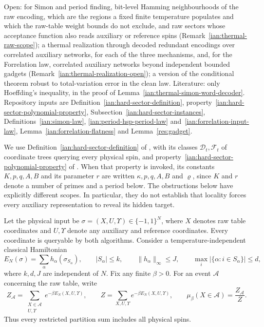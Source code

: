 Open: for Simon and period finding, bit-level Hamming neighbourhoods of the raw encoding, which are the regions a fixed finite temperature populates and which the raw-table weight bounds do not exclude, and raw sectors whose acceptance function also reads auxiliary or reference spins (Remark~\ref{ian:thermal-raw-scope}); a thermal realization through decoded redundant encodings over correlated auxiliary networks, for each of the three mechanisms, and, for the Forrelation law, correlated auxiliary networks beyond independent bounded gadgets (Remark~\ref{ian:thermal-realization-open}); a version of the conditional theorem robust to total-variation error in the clean law. Literature: only Hoeffding's inequality, in the proof of Lemma~\ref{ian:thermal-simon-word-decoder}. Repository inputs are Definition~\ref{ian:hard-sector-definition}, property~\eqref{ian:hard-sector-polynomial-property}, Subsection~\ref{ian:hard-sector-instances}, Definitions~\ref{ian:simon-law}, \ref{ian:period-hsp-period-law} and~\ref{ian:forrelation-input-law}, Lemma~\ref{ian:forrelation-flatness} and Lemma~\ref{res:gadget}.

We use Definition~\ref{ian:hard-sector-definition} of
, with its classes
\(\mathcal D_t,\mathcal F_t\) of coordinate trees querying every
physical spin, and property~\eqref{ian:hard-sector-polynomial-property}
of . When that property
is invoked, its constants \(K,p,q,A,B\) and its parameter \(r\) are
written \(\kappa,p,q,A,B\) and \(\varrho\), since \(K\) and \(r\) denote
a number of primes and a period below.
The obstructions below have explicitly different scopes. In particular,
they do not establish that locality forces every auxiliary representation
to reveal its hidden target.

\begin{definition}
\label{ian:thermal-physical-conventions}
Let the physical input be \(\sigma=(X,U,\Upsilon)\in\{-1,1\}^N\), where \(X\)
denotes raw table coordinates and \(U,\Upsilon\) denote any auxiliary and
reference coordinates. Every coordinate is queryable by both algorithms.
Consider a temperature-independent classical Hamiltonian
\[
 E_N(\sigma)=\sum_{\alpha}h_\alpha(\sigma_{S_\alpha}),
 \qquad |S_\alpha|\le k,\qquad
 \|h_\alpha\|_\infty\le J,\qquad
 \max_i|\{\alpha:i\in S_\alpha\}|\le d,
 \tag{36.1}\label{ian:thermal-local-bounds}
\]
where \(k,d,J\) are independent of \(N\). Fix any finite
\(\beta>0\). For an event \(\mathcal A\) concerning the raw table, write
\[
 Z_{\mathcal A}=\sum_{\substack{X\in\mathcal A\\U,\Upsilon}}e^{-\beta E_N(X,U,\Upsilon)},
 \qquad
 Z=\sum_{X,U,\Upsilon}e^{-\beta E_N(X,U,\Upsilon)},
 \qquad
 \mu_\beta(X\in\mathcal A)=\frac{Z_{\mathcal A}}{Z}.
 \tag{36.2}
\]
Thus every restricted partition sum includes all physical spins.
\end{definition}

